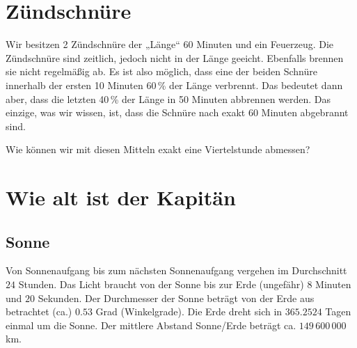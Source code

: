 \section{Zündschnüre}
Wir besitzen 2 Zündschnüre der „Länge“ 60 Minuten und ein Feuerzeug. Die
Zündschnüre sind zeitlich, jedoch nicht in der Länge geeicht. Ebenfalls brennen
sie nicht regelmäßig ab. Es ist also möglich, dass eine der beiden Schnüre
innerhalb der ersten 10 Minuten 60\,\% der Länge verbrennt. Das bedeutet dann
aber, dass die letzten 40\,\% der Länge in 50 Minuten abbrennen werden.
Das einzige, was wir wissen, ist, dass die Schnüre nach exakt 60 Minuten
abgebrannt sind.

Wie können wir mit diesen Mitteln exakt eine Viertelstunde abmessen?
\TNTeop{}



\section{Wie alt ist der Kapitän}

\subsection{Sonne}
Von Sonnenaufgang bis zum nächsten Sonnenaufgang vergehen im Durchschnitt
$24$ Stunden. Das Licht braucht von der Sonne bis zur Erde (ungefähr) $8$
Minuten und $20$ Sekunden. Der Durchmesser der Sonne beträgt von der Erde
aus betrachtet (ca.) $0.53$ Grad (Winkelgrade). Die Erde dreht sich in
$365.2524$
Tagen einmal um die Sonne. Der mittlere Abstand Sonne/Erde beträgt ca.
$149\,600\,000$ km.

